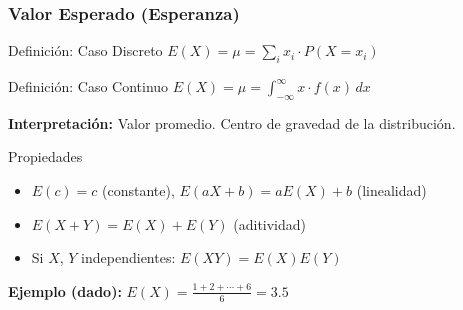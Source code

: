 \documentclass[aspectratio=169,11pt]{beamer}
\begin{document}
\begin{frame}[fragile]
\frametitle{Valor Esperado (Esperanza)}

\small

\begin{block}{Definición: Caso Discreto}
$E(X) = \mu = \sum_{i} x_i \cdot P(X = x_i)$
\end{block}

\pause
\vspace{-0.1cm}
\begin{block}{Definición: Caso Continuo}
$E(X) = \mu = \int_{-\infty}^{\infty} x \cdot f(x) \, dx$
\end{block}

\pause
\vspace{-0.05cm}
\textbf{Interpretación:} Valor promedio. Centro de gravedad de la distribución.

\pause
\vspace{-0.05cm}
\begin{block}{Propiedades}
\begin{itemize}\setlength{\itemsep}{0pt}
  \item $E(c) = c$ (constante), \quad $E(aX + b) = aE(X) + b$ (linealidad)
  \item $E(X + Y) = E(X) + E(Y)$ (aditividad)
  \item Si $X$, $Y$ independientes: $E(XY) = E(X) E(Y)$
\end{itemize}
\end{block}

\pause
\vspace{-0.05cm}
\textbf{Ejemplo (dado):} $E(X) = \frac{1+2+\cdots+6}{6} = 3.5$
\end{frame}
\end{document}
